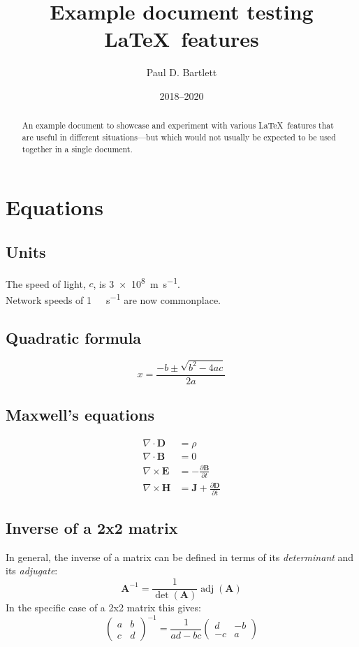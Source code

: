 \documentclass[11pt,a4paper]{article}
\title{Example document testing \LaTeX\ features}
\author{Paul D. Bartlett}
\date{2018--2020}
\begin{document}
\maketitle

\begin{abstract}
An example document to showcase and experiment with various \LaTeX\ features that
are useful in different situations---but which would not usually be expected to be used
together in a single document.
\end{abstract}

\tableofcontents
\listoftables
\listoffigures

\section{Equations}

\subsection{Units}
The speed of light, $c$, is \SI{3e8}{\metre\per\second}.\\
Network speeds of \SI[per-mode=symbol]{1}{\gibi\bit\per\second} are now commonplace.

\subsection{Quadratic formula}
\begin{equation}
x = \frac{-b \pm \sqrt{b^2 - 4ac}}{2a}
\end{equation}

\subsection{Maxwell's equations}
\begin{align}
\nabla \cdot \mathbf{D} &= \rho\\
\nabla \cdot \mathbf{B} &= 0\\
\nabla \times \mathbf{E} &= -\frac{\partial \mathbf{B}} {\partial t}\\
\nabla \times \mathbf{H} &= \mathbf{J} + \frac{\partial \mathbf{D}} {\partial t}
\end{align}

\subsection{Inverse of a 2x2 matrix}
In general, the inverse of a matrix can be defined in terms of its \textit{determinant}
and its \textit{adjugate}:
\begin{equation}
\mathbf{A}^{-1} = \frac{1}{\det(\mathbf{A})} \operatorname{adj}(\mathbf{A})
\end{equation}
In the specific case of a 2x2 matrix this gives:
\begin{equation}
\begin{pmatrix}
a & b\\
c & d
\end{pmatrix}^{-1}
=
\frac{1}{ad-bc}
\begin{pmatrix}
d & -b\\
-c & a
\end{pmatrix}
\end{equation}
\end{document}
